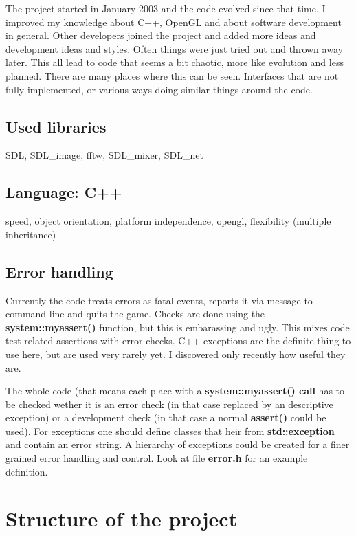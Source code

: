 \documentclass{report}
\begin{document}
The project started in January 2003 and the code evolved since that
time. I improved my knowledge about C++, OpenGL and about software
development in general. Other developers joined the project and added
more ideas and development ideas and styles. Often things were just
tried out and thrown away later. This all lead to code that seems a bit
chaotic, more like evolution and less planned. There are many places
where this can be seen. Interfaces that are not fully implemented, or
various ways doing similar things around the code.
  


\subsection{Used libraries}

SDL, SDL\_image, fftw, SDL\_mixer, SDL\_net

\subsection{Language: C++}

speed, object orientation, platform independence, opengl, flexibility (multiple inheritance)

\subsection{Error handling}

Currently the code treats errors as fatal events, reports it via message
to command line and quits the game. Checks are done using the
\textbf{system::myassert()} function, but this is embarassing and ugly.
This mixes code test related assertions with error checks.  C++
exceptions are the definite thing to use here, but are used very rarely
yet. I discovered only recently how useful they are.
    
The whole code (that means each place with a \textbf{system::myassert()
  call} has to be checked wether it is an error check (in that case
replaced by an descriptive exception) or a development check (in that
case a normal \textbf{assert()} could be used). For exceptions one
should define classes that heir from \textbf{std::exception} and contain
an error string. A hierarchy of exceptions could be created for a finer
grained error handling and control. Look at file \textbf{error.h} for an
example definition.



\section{Structure of the project}
\end{document}
